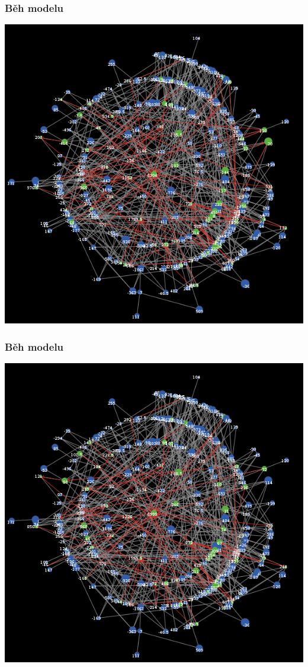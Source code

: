 \documentclass[xcolor=dvipsnames]{beamer}
\begin{document}
    \begin{frame}
    \frametitle{Běh modelu}
    \includegraphics[width=0.6\paperwidth]{16.png}
  \end{frame}
  \begin{frame}
    \frametitle{Běh modelu}
    \includegraphics[width=0.6\paperwidth]{17.png}
  \end{frame}
\end{document}
